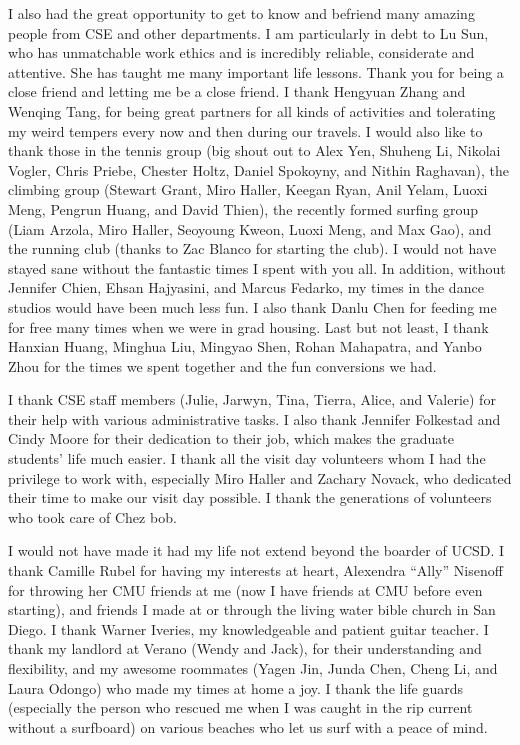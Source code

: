 \documentclass[12pt]{ucsddissertation}
\begin{document}
\begin{acknowledgements}
I also had the great opportunity to get to know and befriend many amazing people from CSE and other departments. I am particularly in debt to Lu Sun, who has unmatchable work ethics and is incredibly reliable, considerate and attentive. She has taught me many important life lessons. Thank you for being a close friend and letting me be a close friend. I thank Hengyuan Zhang and Wenqing Tang, for being great partners for all kinds of activities and tolerating my weird tempers every now and then during our travels. I would also like to thank those in the tennis group (big shout out to Alex Yen, Shuheng Li, Nikolai Vogler, Chris Priebe, Chester Holtz, Daniel Spokoyny, and Nithin Raghavan), the climbing group (Stewart Grant, Miro Haller, Keegan Ryan, Anil Yelam, Luoxi Meng, Pengrun Huang, and David Thien), the recently formed surfing group (Liam Arzola, Miro Haller, Seoyoung Kweon, Luoxi Meng, and Max Gao), and the running club (thanks to Zac Blanco for starting the club). I would not have stayed sane without the fantastic times I spent with you all. In addition, without Jennifer Chien, Ehsan Hajyasini, and Marcus Fedarko,
my times in the dance studios would have been much less fun.
I also thank Danlu Chen for feeding me for free many times when we were in grad housing. Last but not least, I thank Hanxian Huang, Minghua Liu, Mingyao Shen, Rohan Mahapatra, and Yanbo Zhou for the times we spent together and the fun conversions we had.

I thank CSE staff members (Julie, Jarwyn, Tina, Tierra, Alice, and Valerie) for their help with various administrative tasks. I also thank Jennifer Folkestad and Cindy Moore for their dedication to their job, which makes the graduate students' life much easier. I thank all the visit day volunteers whom I had the privilege to work with, especially Miro Haller and Zachary Novack, who dedicated their time to make our visit day possible. I thank the generations of volunteers who took care of Chez bob.

I would not have made it had my life not extend beyond the boarder of UCSD. I thank Camille Rubel for having my interests at heart, Alexendra ``Ally'' Nisenoff for throwing her CMU friends at me (now I have friends at CMU before even starting), and friends I made at or through the living water bible church in San Diego. I thank Warner Iveries, my knowledgeable and patient guitar teacher. I thank my landlord at Verano (Wendy and Jack), for their understanding and flexibility, and my awesome roommates (Yagen Jin, Junda Chen, Cheng Li, and Laura Odongo) who made my times at home a joy. I thank the life guards (especially the person who rescued me when I was caught in the rip current without a surfboard) on various beaches who let us surf with a peace of mind. 



\end{acknowledgements}
\end{document}
